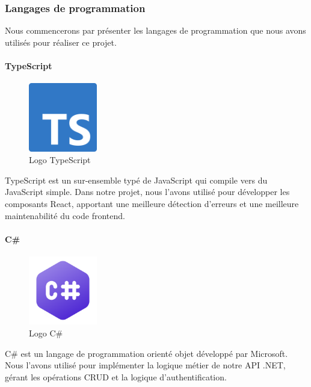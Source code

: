 \subsubsection{Langages de programmation}

\noindent Nous commencerons par présenter les langages de programmation que nous avons utilisés pour réaliser ce projet.

\paragraph{TypeScript}

\begin{figure}[H]
    \centering
    \includegraphics[width=3cm, height=3cm]{images/typescript.png}
    \caption{Logo TypeScript}
\end{figure}

\noindent TypeScript est un sur-ensemble typé de JavaScript qui compile vers du JavaScript simple. Dans notre projet, nous l'avons utilisé pour développer les composants React, apportant une meilleure détection d'erreurs et une meilleure maintenabilité du code frontend.

\paragraph{C\#}

\begin{figure}[H]
    \centering
    \includegraphics[width=3cm, height=3cm]{images/csharp.png}
    \caption{Logo C\#}
\end{figure}

\noindent C\# est un langage de programmation orienté objet développé par Microsoft. Nous l'avons utilisé pour implémenter la logique métier de notre API .NET, gérant les opérations CRUD et la logique d'authentification.

